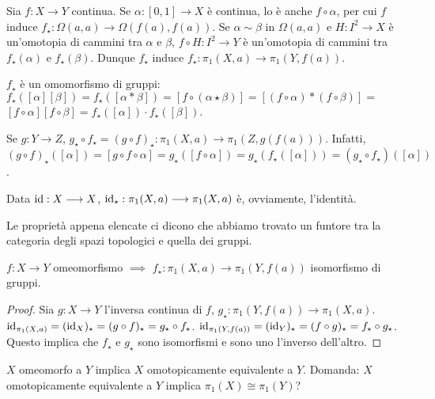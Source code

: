 Sia $f:X \longrightarrow Y$ continua. Se $\alpha: [0, 1] \longrightarrow X$ è continua, lo è anche $f \circ \alpha$, per cui $f$ induce $f_{\star}: \Omega(a, a) \longrightarrow \Omega(f(a), f(a))$. Se $\alpha \sim \beta$ in $\Omega(a, a)$ e $H: I^2 \longrightarrow X$ è un'omotopia di cammini tra $\alpha$ e $\beta$,
$f \circ H: I^2 \longrightarrow Y$ è un'omotopia di cammini tra $f_{\star}(\alpha)$ e $f_{\star}(\beta)$. Dunque $f_{\star}$ induce $f_{\star}: \pi_1(X, a) \longrightarrow \pi_1(Y, f(a))$.
\begin{nlist}
  \item $f_{\star}$ è un omomorfismo di gruppi: $f_{\star}([\alpha][\beta])=f_{\star}([\alpha * \beta])=[f \circ (\alpha \star \beta)]=[(f \circ \alpha) * (f \circ \beta)]=$
  $[f \circ \alpha][f \circ \beta]=f_{\star}([\alpha]) \cdot f_{\star}([\beta])$.
  \item Se $g: Y \longrightarrow Z$, $g_{\star} \circ f_{\star}=(g \circ f)_{\star}: \pi_1(X, a) \longrightarrow \pi_1(Z, g(f(a)))$.
  Infatti, $(g \circ f)_{\star}([\alpha])=[g \circ f \circ \alpha]=g_{\star}([f \circ \alpha])=g_{\star}(f_{\star}([\alpha]))=(g_{\star} \circ f_{\star})([\alpha])$.
  \item Data $\operatorname{id}: X \longrightarrow X$, $\operatorname{id}_{\star}: \pi_1(X, a) \longrightarrow \pi_1(X, a)$ è, ovviamente, l'identità.
\end{nlist}
Le proprietà appena elencate ci dicono che abbiamo trovato un funtore tra la categoria degli spazi topologici e quella dei gruppi.

\begin{cor}
  $f:X \longrightarrow Y$ omeomorfismo $\implies$ $f_{\star}: \pi_1(X, a) \longrightarrow \pi_1(Y, f(a))$ isomorfismo di gruppi.
\end{cor}

\begin{proof}
  Sia $g: X \longrightarrow Y$ l'inversa continua di $f$, $g_{\star}: \pi_1(Y, f(a)) \longrightarrow \pi_1(X, a)$. $\operatorname{id}_{\pi_1(X, a)}=(\operatorname{id}_X)_{\star}=(g \circ f)_{\star}=g_{\star} \circ f_{\star}$.
  $\operatorname{id}_{\pi_1(Y, f(a))}=(\operatorname{id}_Y)_{\star}=(f \circ g)_{\star}=f_{\star} \circ g_{\star}$. Questo implica che $f_{\star}$ e $g_{\star}$ sono isomorfismi e sono uno l'inverso dell'altro.
\end{proof}

\begin{oss}
  $X$ omeomorfo a $Y$ implica $X$ omotopicamente equivalente a $Y$. Domanda: $X$ omotopicamente equivalente a $Y$ implica $\pi_1(X) \cong \pi_1(Y)$?
\end{oss}

